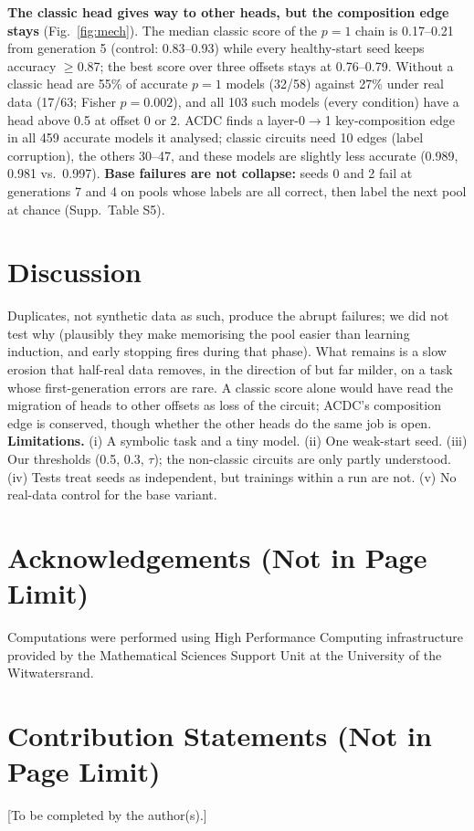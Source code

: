 \documentclass[10pt,letterpaper]{article}
\begin{document}
\textbf{The classic head gives way to other heads, but the composition edge stays}
(Fig.~\ref{fig:mech}). The median
classic score of the $p{=}1$ chain is 0.17--0.21 from generation 5 (control:
0.83--0.93) while every healthy-start seed keeps accuracy $\ge$0.87; the best score
over three offsets stays at 0.76--0.79. Without a classic head are 55\% of accurate
$p{=}1$ models (32/58) against 27\% under real data (17/63; Fisher $p{=}0.002$), and
all 103 such models (every condition) have a head above 0.5 at offset 0 or 2. ACDC
finds a layer-0$\to$1 key-composition edge in all 459 accurate models it analysed;
classic circuits need 10 edges (label corruption), the others 30--47, and these
models are slightly less accurate (0.989, 0.981 vs.\ 0.997). \textbf{Base failures
are not collapse:} seeds 0 and 2 fail at generations 7 and 4 on pools whose labels
are all correct, then label the next pool at chance (Supp.\ Table S5).

\section{Discussion}
Duplicates, not synthetic data as such, produce the abrupt failures; we did not test
why (plausibly they make memorising the pool easier than learning induction, and
early stopping fires during that phase). What remains is a slow erosion that
half-real data removes, in the direction of
\citet{shumailov2023curse,shumailov2024ai} but far milder, on a task whose
first-generation errors are rare. A classic score alone would have read the
migration of heads to other offsets as loss of the circuit; ACDC's composition edge
is conserved, though whether the other heads do the same job is open.
\textbf{Limitations.} (i) A symbolic task and a tiny model. (ii) One
weak-start seed. (iii) Our thresholds (0.5, 0.3, $\tau$); the non-classic circuits
are only partly understood. (iv) Tests treat seeds as independent, but trainings
within a run are not. (v) No real-data control for the base variant.

\section{Acknowledgements (Not in Page Limit)}
Computations were performed using High Performance Computing infrastructure
provided by the Mathematical Sciences Support Unit at the University of the
Witwatersrand.

\section{Contribution Statements (Not in Page Limit)}
[To be completed by the author(s).]
\end{document}
